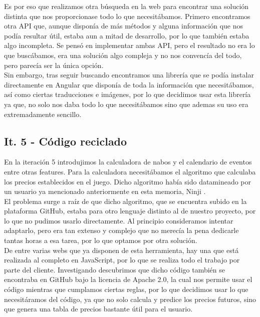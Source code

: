 Es por eso que realizamos otra búsqueda en la web para encontrar una solución distinta que nos proporcionase todo lo que necesitábamos. Primero encontramos otra API \citep{nookipediaapi} que, aunque disponía de más métodos y alguna información que nos podía resultar útil, estaba aun a mitad de desarrollo, por lo que también estaba algo incompleta. Se pensó en implementar ambas API, pero el resultado no era lo que buscábamos, era una solución algo compleja y no nos convencía del todo, pero parecía ser la única opción.\\

Sin embargo, tras seguir buscando encontramos una librería \citep{acnhnpm} que se podía instalar directamente en Angular que disponía de toda la información que necesitábamos, así como ciertas traducciones e imágenes, por lo que decidimos usar esta librería ya que, no solo nos daba todo lo que necesitábamos sino que ademas su uso era extremadamente sencillo. 

\subsection{It. 5 - Código reciclado}

En la iteración 5 introdujimos la calculadora de nabos y el calendario de eventos entre otras features. Para la calculadora necesitábamos el algoritmo que calculaba los precios establecidos en el juego. Dicho algoritmo había sido datamineado por un usuario ya mencionado anteriormente en esta memoria, Ninji \citep{nabosninji}.\\

El problema surge a raíz de que dicho algoritmo, que se encuentra subido en la plataforma GitHub, estaba para otro lenguaje distinto al de nuestro proyecto, por lo que no pudimos usarlo directamente. Al principio consideramos intentar adaptarlo, pero era tan extenso y complejo que no merecía la pena dedicarle tantas horas a esa tarea, por lo que optamos por otra solución.\\

De entre varias webs que ya disponen de esta herramienta, hay una \citep{turnipprophet} que está realizada al completo en JavaScript, por lo que se realiza todo el trabajo por parte del cliente. Investigando descubrimos que dicho código también se encontraba en GitHub bajo la licencia de Apache 2.0, la cual nos permite usar el código mientras que cumplamos ciertas reglas, por lo que decidimos usar lo que necesitáramos del código, ya que no solo calcula y predice los precios futuros, sino que genera una tabla de precios bastante útil para el usuario.\\

